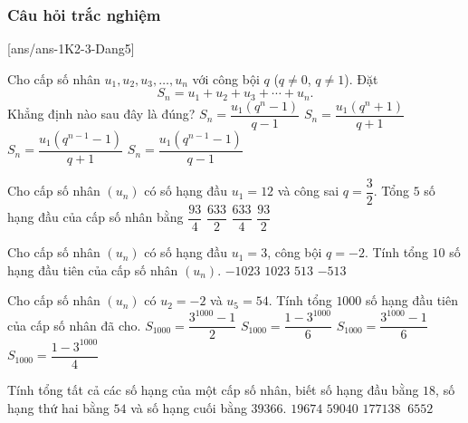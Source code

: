 \subsubsection{Câu hỏi trắc nghiệm}
[ans/ans-1K2-3-Dang5]
\begin{ex}%
	Cho cấp số nhân $u_1,u_2,u_3,\ldots,u_n$ với công bội $q$ ($q\neq 0$, $q\neq 1$). Đặt \[S_n=u_1+u_2+u_3+\cdots +u_n.\] Khẳng định nào sau đây là đúng?
	\choice
	{\True $S_n = \dfrac{u_1\left(q^n-1\right)}{q-1}$}
	{$S_n = \dfrac{u_1\left(q^n+1\right)}{q+1}$}
	{$S_n = \dfrac{u_1\left(q^{n-1}-1\right)}{q+1}$}
	{$S_n = \dfrac{u_1\left(q^{n-1}-1\right)}{q-1}$}
\end{ex}
\begin{ex}%
	Cho cấp số nhân $(u_n)$ có số hạng đầu $u_1=12$ và công sai $q=\dfrac{3}{2}$. Tổng $5$ số hạng đầu của cấp số nhân bằng
	\choice
	{$\dfrac{93}{4}$}
	{$\dfrac{633}{2}$}
	{\True $\dfrac{633}{4}$}
	{$\dfrac{93}{2}$}
\end{ex}
\begin{ex}%
	Cho cấp số nhân $(u_n)$ có số hạng đầu $u_1=3$, công bội $q=-2$. Tính tổng $10$ số hạng đầu tiên của cấp số nhân $(u_n)$.
	\choice
	{\True $-1023$}
	{$1023$}
	{$513$}
	{$-513$}
\end{ex}
\begin{ex}%
	Cho cấp số nhân $(u_n)$ có $u_2=-2$ và $u_5=54$. Tính tổng $1000$ số hạng đầu tiên của cấp số nhân đã cho.
	\choice
	{$S_{1000}=\dfrac{3^{1000}-1}{2}$}
	{\True $S_{1000}=\dfrac{1-3^{1000}}{6}$}
	{$S_{1000}=\dfrac{3^{1000}-1}{6}$}
	{$S_{1000}=\dfrac{1-3^{1000}}{4}$}
\end{ex}
\begin{ex}%
	Tính tổng tất cả các số hạng của một cấp số nhân, biết số hạng đầu bằng $18$, số hạng thứ hai bằng $54$ và số hạng cuối bằng $39366$.
	\choice
	{$19674$}
	{\True $59040$}
	{$177138$}
	{$~6552$}
\end{ex}
